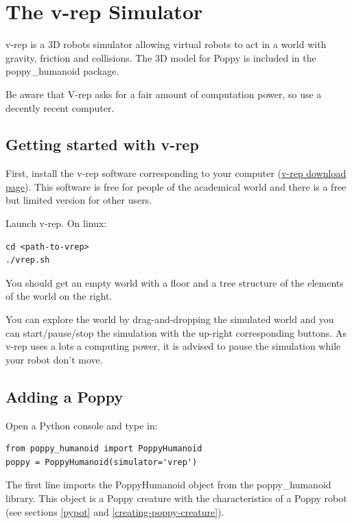\documentclass{article}
\begin{document}
\section{The v-rep Simulator}
\label{v-rep}

v-rep is a 3D robots simulator allowing virtual robots to act in a world with gravity, friction and collisions. The 3D model for Poppy is included in the poppy\_humanoid package.

Be aware that V-rep asks for a fair amount of computation power, so use a decently recent computer.

\subsection{Getting started with v-rep}

First, install the v-rep software corresponding to your computer (\href{http://www.coppeliarobotics.com/downloads.html}{v-rep download page}). This software is free for people of the academical world and there is a free but limited version for other users.

Launch v-rep. On linux:

\begin{verbatim}
cd <path-to-vrep>
./vrep.sh
\end{verbatim}

You should get an empty world with a floor and a tree structure of the elements of the world on the right.

You can explore the world by drag-and-dropping the simulated world and you can start/pause/stop the simulation with the up-right corresponding buttons. As v-rep uses a lots a computing power, it is advised to pause the simulation while your robot don't move.

\subsection{Adding a Poppy}

Open a Python console and type in:

\begin{verbatim}
from poppy_humanoid import PoppyHumanoid
poppy = PoppyHumanoid(simulator='vrep')
\end{verbatim}

The first line imports the PoppyHumanoid object from the poppy\_humanoid library. This object is a Poppy creature with the characteristics of a Poppy robot (see sections \ref{pypot} and \ref{creating-poppy-creature}).
\end{document}

